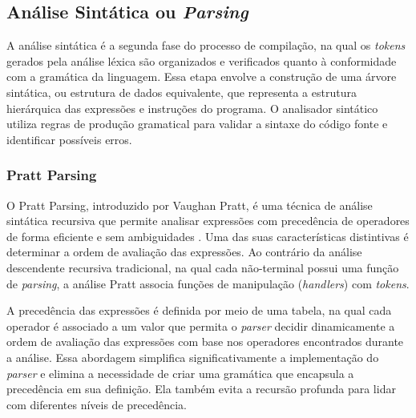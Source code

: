 \documentclass[english, 
               brazil, 
               bsc] %
               {dcomp-abntex2}
\begin{document}
\subsection{Análise Sintática ou \textit{Parsing}}
A análise sintática é a segunda fase do processo de compilação, na qual os \textit{tokens} gerados pela análise léxica são organizados e verificados quanto à conformidade com a gramática da linguagem. Essa etapa envolve a construção de uma árvore sintática, ou estrutura de dados equivalente, que representa a estrutura hierárquica das expressões e instruções do programa. O analisador sintático utiliza regras de produção gramatical para validar a sintaxe do código fonte e identificar possíveis erros.

\subsubsection{Pratt Parsing}
O Pratt Parsing, introduzido por Vaughan Pratt, é uma técnica de análise sintática recursiva que permite analisar expressões com precedência de operadores de forma eficiente e sem ambiguidades \cite{pratt}. Uma das suas características distintivas é determinar a ordem de avaliação das expressões. Ao contrário da análise descendente recursiva tradicional, na qual cada não-terminal possui uma função de \textit{parsing}, a análise Pratt associa funções de manipulação (\textit{handlers}) com \textit{tokens}.

A precedência das expressões é definida por meio de uma tabela, na qual cada operador é associado a um valor que permita o \textit{parser} decidir dinamicamente a ordem de avaliação das expressões com base nos operadores encontrados durante a análise. Essa abordagem simplifica significativamente a implementação do \textit{parser} e elimina a necessidade de criar uma gramática que encapsula a precedência em sua definição. Ela também evita a recursão profunda para lidar com diferentes níveis de precedência.
\end{document}
